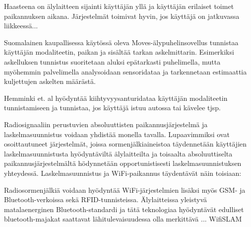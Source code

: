 Haasteena on älylaitteen sijainti käyttäjän yllä ja käyttäjän erilaiset
toimet paikannuksen aikana. Järjestelmät toimivat hyvin, jos käyttäjä
on jatkuvassa liikkeessä...

Suomalainen kaupallisessa käytössä oleva
Moves-älypuhelinsovellus tunnistaa käyttäjän modaliteetin, paikan ja
sisältää tarkan askelmittarin. Esimerkiksi askelluksen tunnistus suoritetaan
aluksi epätarkasti puhelimella, mutta myöhemmin palvelimella analysoidaan
sensoridataa ja tarkennetaan estimaattia kuljettujen askelten määrästä.

Hemminki et. al hyödyntää kiihtyvyysanturidataa käyttäjän modaliteetin
tunnistamiseen ja tunnistaa, jos käyttäjä istuu autossa tai kävelee tjsp.

Radiosignaaliin perustuvien absoluuttisten paikannusjärjestelmä
ja laskelmasuunnistus voidaan yhdistää monella tavalla. Lupaavimmiksi
ovat osoittautuneet järjestelmät, joissa sormenjälkiaineistoa täydennetään
käyttäjien laskelmasuunnistusta hyödyntäviltä älylaitteilta ja 
toisaalta absoluuttiselta paikannusjärjestelmältä hödynnetään
opportunistisesti laskelmasuunnistuksen yhteydessä. Laskelmasuunnistus ja
WiFi-paikannus täydentävät näin toisiaan: 

Radiosormenjälkiä voidaan hyödyntää WiFi-järjestelmien lisäksi myös
GSM- ja Bluetooth-verkoissa sekä RFID-tunnisteissa. Älylaitteissa yleistyvä
matalaenerginen
Bluetooth-standardi ja tätä teknologiaa hyödyntävät edulliset bluetooth-majakat
saattavat lähitulevaisuudessa olla merkittävä ... WifiSLAM

